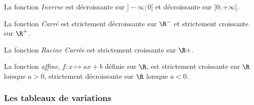 \begin{ThN}
La fonction \emph{Inverse} est décroissante sur $]-\infty;0[$ et  décroissante sur $]0;+\infty[$. 
\end{ThN}

\vspace{0.4cm}

\begin{ThN}
La fonction \emph{Carré} est strictement décroissante sur $\R^-$ et strictement croissante sur $\R^+$. 
\end{ThN}

\vspace{0.4cm} 

\begin{ThN}
La fonction \emph{Racine Carrée} est strictement croissante sur $\R+$. 
\end{ThN}

\vspace{0.4cm} 
 
 \begin{ThN}
La fonction \emph{affine}, $f:x \mapsto ax +b$ définie sur $\R$, est strictement croissante sur $\R$ lorsque $a>0$, strictement décroissante sur $\R$ lorsque $a<0$. 
\end{ThN}

 \newpage
 
\subsubsection*{Les tableaux de variations} 




\vspace{0.4cm}




\vspace{0.4cm}


